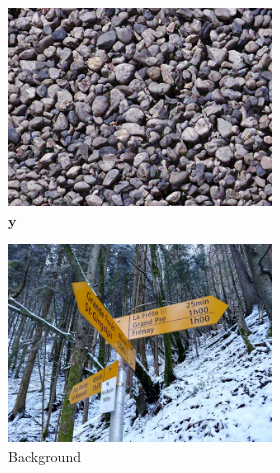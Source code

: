 \begin{figure}[]
\begin{subfigure}{\textwidth}
        \begin{subfigure}{0.24\textwidth}
            \centering
            \includegraphics[width=\textwidth]{images/04-experiment02/photo/pebbles/target.jpg}
            \caption*{\(\bm{y}\)}
        \end{subfigure}
        \hfill
        \begin{subfigure}{0.24\textwidth}
            \centering
            \includegraphics[width=\textwidth]{images/04-experiment02/photo/bg.jpg}
            \caption*{Background}
        \end{subfigure}
        \hfill
        \begin{subfigure}{0.24\textwidth}
            \centering
            \begin{tikzpicture}

\end{tikzpicture}
\end{subfigure}
\end{subfigure}
\end{figure}
